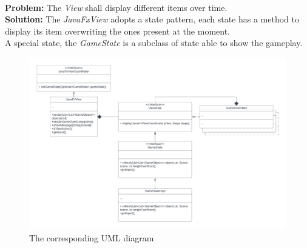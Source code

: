 \documentclass[a4paper,12pt]{report}
\begin{document}
\pagebreak\\
\textbf{Problem:} The \textit{View} shall display different items over time.\\
\textbf{Solution:} The \textit{JavaFxView} adopts a state pattern, each state has a method to display its item overwriting the ones present at the moment.\\
A special state, the \textit{GameState} is a subclass of state able to show the gameplay.
\begin{figure}[ht]
	\centering
	\includegraphics[width=\textwidth]{res/ViewState.pdf}
	\caption{The corresponding UML diagram}
\end{figure}


\pagebreak
\end{document}

